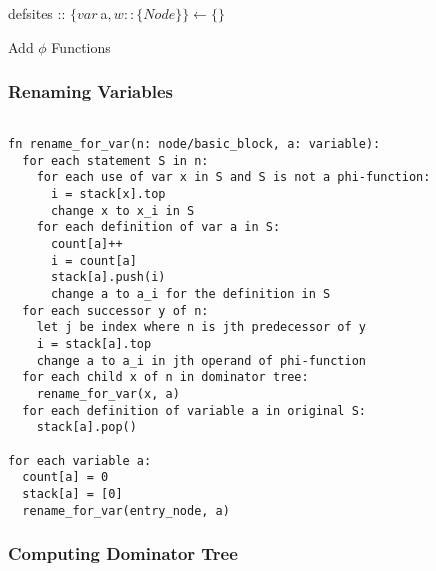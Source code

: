 \documentclass[8pt]{extarticle}
\begin{document}
\begin{multicols*}{2}
  \begin{algorithm}[H]
    defsites :: $\{var\ $a$, w ::\{Node\}\} \leftarrow \{\}$\\
    \caption{Add $\phi$ Functions\label{Algo_add_phi_functions}}
  \end{algorithm}  

  \subsubsection{Renaming Variables}
\begin{verbatim}

fn rename_for_var(n: node/basic_block, a: variable):
  for each statement S in n:
    for each use of var x in S and S is not a phi-function:
      i = stack[x].top
      change x to x_i in S
    for each definition of var a in S:
      count[a]++
      i = count[a]
      stack[a].push(i)
      change a to a_i for the definition in S
  for each successor y of n:
    let j be index where n is jth predecessor of y
    i = stack[a].top
    change a to a_i in jth operand of phi-function
  for each child x of n in dominator tree:
    rename_for_var(x, a)
  for each definition of variable a in original S:
    stack[a].pop()

for each variable a:
  count[a] = 0
  stack[a] = [0]
  rename_for_var(entry_node, a)

\end{verbatim}

  \subsubsection{Computing Dominator Tree}


\end{multicols*}
\end{document}
